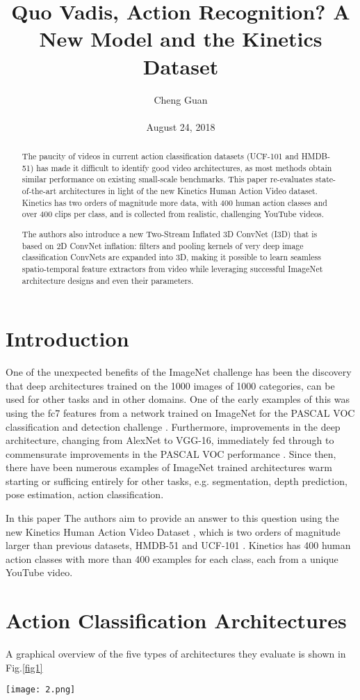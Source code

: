 \documentclass[10pt,twocolumn,letterpaper]{article}
\title{Quo Vadis, Action Recognition? A New Model and the Kinetics Dataset}
\author{Cheng Guan\\\\
August 24, 2018}
\begin{document}
\maketitle
\begin{abstract}
The paucity of videos in current action classification
datasets (UCF-101 and HMDB-51) has made it difficult
to identify good video architectures, as most methods obtain similar performance on existing small-scale benchmarks. This paper re-evaluates state-of-the-art 
architectures in light of the new Kinetics Human Action Video
dataset. Kinetics has two orders of magnitude more data,
with 400 human action classes and over 400 clips per
class, and is collected from realistic, challenging YouTube
videos.
\par
The authors also introduce a new Two-Stream Inflated 3D ConvNet (I3D) that is based on 2D ConvNet inflation: filters and pooling kernels of very deep image 
classification ConvNets are expanded into 3D, making it possible
to learn seamless spatio-temporal feature extractors from
video while leveraging successful ImageNet architecture
designs and even their parameters.
\end{abstract}
\section{Introduction}
One of the unexpected benefits of the ImageNet challenge has been the discovery that deep architectures trained
on the 1000 images of 1000 categories, can be used for other
tasks and in other domains. One of the early examples of
this was using the fc7 features from a network trained on
ImageNet for the PASCAL VOC classification and detection 
challenge \cite{girshick2014rich,oquab2014learning}. Furthermore, improvements in the deep architecture, changing from AlexNet to VGG-16, immediately fed through to commensurate improvements in
the PASCAL VOC performance \cite{ren2015faster}. Since then, there have
been numerous examples of ImageNet trained architectures
warm starting or sufficing entirely for other tasks, e.g. segmentation, depth prediction, pose estimation, action classification.
\par
In this paper The authors aim to provide an answer to this question
using the new Kinetics Human Action Video Dataset \cite{kay2017kinetics},
which is two orders of magnitude larger than previous
datasets, HMDB-51  and UCF-101 . Kinetics has 
400 human action classes with more than 400 examples for
each class, each from a unique YouTube video.
\section{Action Classification Architectures}
A graphical overview of the five types of architectures
they evaluate is shown in Fig.\ref{fig1}
\begin{figure*}
	\centering
	\texttt{[image: 2.png]}
	\label{fig1}
	\caption{Video architectures considered in this paper. \textbf{K} stands for the total number of frames in a video, whereas \textbf{N} stands for a subset of
		neighboring frames of the video.}
\end{figure*}
\end{document}
